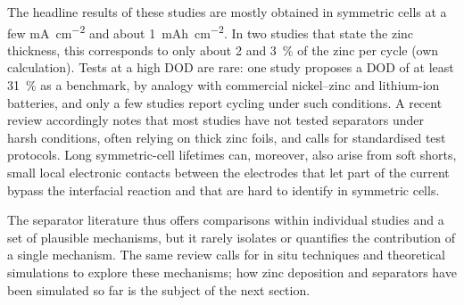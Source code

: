 The headline results of these studies are mostly obtained in symmetric cells at a few \si{mA.cm^{-2}} and about \SI{1}{mAh.cm^{-2}}.
In two studies that state the zinc thickness, this corresponds to only about 2 and \SI{3}{\percent} of the zinc per cycle (own calculation)\cite{sun_janus_2023,kim_mechanically_2025}.
Tests at a high DOD are rare: one study proposes a DOD of at least \SI{31}{\percent} as a benchmark, by analogy with commercial nickel--zinc and lithium-ion batteries\cite{zhang_ionsieving_2022}, and only a few studies report cycling under such conditions\cite{zhang_ionsieving_2022,shao_selfrecognition_2025}.
A recent review accordingly notes that most studies have not tested separators under harsh conditions, often relying on thick zinc foils, and calls for standardised test protocols\cite{gu_role_2025}.
Long symmetric-cell lifetimes can, moreover, also arise from soft shorts, small local electronic contacts between the electrodes that let part of the current bypass the interfacial reaction and that are hard to identify in symmetric cells\cite{li_soft_2022}.

The separator literature thus offers comparisons within individual studies and a set of plausible mechanisms, but it rarely isolates or quantifies the contribution of a single mechanism.
The same review calls for in situ techniques and theoretical simulations to explore these mechanisms\cite{gu_role_2025}; how zinc deposition and separators have been simulated so far is the subject of the next section.

